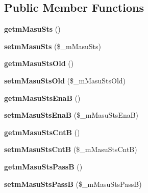 \subsection*{Public Member Functions}
\begin{DoxyCompactItemize}
\item 
{\bfseries getm\+Masu\+Sts} ()\hypertarget{class_reversi_a995fd4e134f3161d0d67caddd362ddda}{}\label{class_reversi_a995fd4e134f3161d0d67caddd362ddda}

\item 
{\bfseries setm\+Masu\+Sts} (\$\+\_\+m\+Masu\+Sts)\hypertarget{class_reversi_abfd5a55ea9efdd26a609557b59c0d12e}{}\label{class_reversi_abfd5a55ea9efdd26a609557b59c0d12e}

\item 
{\bfseries getm\+Masu\+Sts\+Old} ()\hypertarget{class_reversi_a32328d1f1bf56d2e84141a8c9804f359}{}\label{class_reversi_a32328d1f1bf56d2e84141a8c9804f359}

\item 
{\bfseries setm\+Masu\+Sts\+Old} (\$\+\_\+m\+Masu\+Sts\+Old)\hypertarget{class_reversi_a71900505df416c91732e8e0196127b94}{}\label{class_reversi_a71900505df416c91732e8e0196127b94}

\item 
{\bfseries getm\+Masu\+Sts\+EnaB} ()\hypertarget{class_reversi_aff36ab36553b866ca2a8be3fdf3bf2f0}{}\label{class_reversi_aff36ab36553b866ca2a8be3fdf3bf2f0}

\item 
{\bfseries setm\+Masu\+Sts\+EnaB} (\$\+\_\+m\+Masu\+Sts\+EnaB)\hypertarget{class_reversi_a96a62c362d81a5861eb5e875de2376f0}{}\label{class_reversi_a96a62c362d81a5861eb5e875de2376f0}

\item 
{\bfseries getm\+Masu\+Sts\+CntB} ()\hypertarget{class_reversi_ae26e602c710657395eb489795fd0ccb7}{}\label{class_reversi_ae26e602c710657395eb489795fd0ccb7}

\item 
{\bfseries setm\+Masu\+Sts\+CntB} (\$\+\_\+m\+Masu\+Sts\+CntB)\hypertarget{class_reversi_a006a77defc43d4195d30950666710e7d}{}\label{class_reversi_a006a77defc43d4195d30950666710e7d}

\item 
{\bfseries getm\+Masu\+Sts\+PassB} ()\hypertarget{class_reversi_afc5e8bfd7ef5cfa8d4b93ab0146b1bd6}{}\label{class_reversi_afc5e8bfd7ef5cfa8d4b93ab0146b1bd6}

\item 
{\bfseries setm\+Masu\+Sts\+PassB} (\$\+\_\+m\+Masu\+Sts\+PassB)\hypertarget{class_reversi_a426ce5e0ef8cd875b75abe23c0d14a14}{}\label{class_reversi_a426ce5e0ef8cd875b75abe23c0d14a14}


\end{DoxyCompactItemize}
